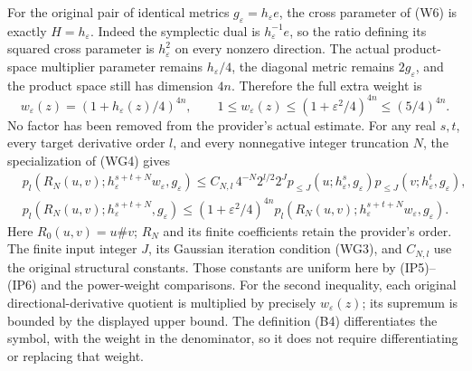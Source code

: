 \documentclass[
  11pt,
]{article}
\begin{document}
For the original pair of identical metrics
\(g_\varepsilon=h_\varepsilon e\), the cross parameter of (W6) is
exactly \(H=h_\varepsilon\). Indeed the symplectic dual is
\(h_\varepsilon^{-1}e\), so the ratio defining its squared cross
parameter is \(h_\varepsilon^2\) on every nonzero direction. The actual
product-space multiplier parameter remains \(h_\varepsilon/4\), the
diagonal metric remains \(2g_\varepsilon\), and the product space still
has dimension \(4n\). Therefore the full extra weight is \[
 w_\varepsilon(z)=(1+h_\varepsilon(z)/4)^{4n},\qquad
 1\leq w_\varepsilon(z)
       \leq(1+\varepsilon^2/4)^{4n}\leq(5/4)^{4n}.
 \tag{RP1}
\] No factor has been removed from the provider's actual estimate. For
any real \(s,t\), every target derivative order \(l\), and every
nonnegative integer truncation \(N\), the specialization of (WG4) gives
\[
\begin{aligned}
 &p_l\!\left(R_N(u,v);
       h_\varepsilon^{s+t+N}w_\varepsilon,g_\varepsilon\right)
 \leq C_{N,l}\,4^{-N}2^{l/2}2^J
       p_{\leq J}(u;h_\varepsilon^s,g_\varepsilon)
       p_{\leq J}(v;h_\varepsilon^t,g_\varepsilon),\\
 &p_l\!\left(R_N(u,v);
       h_\varepsilon^{s+t+N},g_\varepsilon\right)
 \leq(1+\varepsilon^2/4)^{4n}
       p_l\!\left(R_N(u,v);
       h_\varepsilon^{s+t+N}w_\varepsilon,g_\varepsilon\right).
\end{aligned}
\tag{RP2}
\] Here \(R_0(u,v)=u\#v\); \(R_N\) and its finite coefficients retain
the provider's order. The finite input integer \(J\), its Gaussian
iteration condition (WG3), and \(C_{N,l}\) use the original structural
constants. Those constants are uniform here by (IP5)--(IP6) and the
power-weight comparisons. For the second inequality, each original
directional-derivative quotient is multiplied by precisely
\(w_\varepsilon(z)\); its supremum is bounded by the displayed upper
bound. The definition (B4) differentiates the symbol, with the weight in
the denominator, so it does not require differentiating or replacing
that weight.
\end{document}

